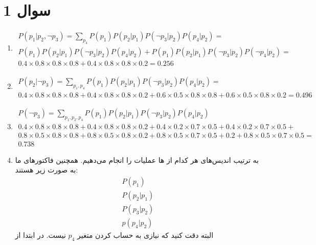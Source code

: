 \section*{سوال 1}
\begin{enumerate}
    \item \phantom{متن}
    \begin{gather*}
        P(p_1 | p_2, \neg p_3) = \sum_{p_4} P(p_1) P(p_2 | p_1) P(\neg p_3 | p_2) P(p_4 | p_2) =\\
        P(p_1) P(p_2 | p_1) P(\neg p_3 | p_2) P(p_4 | p_2) + P(p_1) P(p_2 | p_1) P(\neg p_3 | p_2) P(\neg p_4 | p_2) =\\
        0.4 \times 0.8 \times 0.8 \times 0.8 + 0.4 \times 0.8 \times 0.8 \times 0.2 = 0.256
    \end{gather*}
    \item \phantom{متن}
    \begin{gather*}
        P(p_2 | \neg p_3) = \sum_{p_1, p_4} P(p_1) P(p_2 | p_1) P(\neg p_3 | p_2) P(p_4 | p_2) =\\
        0.4 \times 0.8 \times 0.8 \times 0.8 + 0.4 \times 0.8 \times 0.8 \times 0.2 + 0.6 \times 0.5 \times 0.8 \times 0.8 + 0.6 \times 0.5 \times 0.8 \times 0.2 = 0.496
    \end{gather*}
    \item \phantom{متن}
    \begin{gather*}
        P(\neg p_3) = \sum_{p_1, p_2, p_4} P(p_1) P(p_2 | p_1) P(\neg p_3 | p_2) P(p_4 | p_2)\\
        0.4 \times 0.8 \times 0.8 \times 0.8 + 0.4 \times 0.8 \times 0.8 \times 0.2 + 0.4 \times 0.2 \times 0.7 \times 0.5 + 0.4 \times 0.2 \times 0.7 \times 0.5 +\\
        0.8 \times 0.5 \times 0.8 \times 0.8 + 0.8 \times 0.5 \times 0.8 \times 0.2 + 0.8 \times 0.5 \times 0.7 \times 0.5 + 0.2 + 0.8 \times 0.5 \times 0.7 \times 0.5 =\\
        0.738
    \end{gather*}
    \item به ترتیب اندیس‌های هر کدام از ها عملیات را انجام می‌دهیم.
    همچنین فاکتور‌های ما به صورت زیر هستند:
    \begin{gather*}
        P(p_1)\\
        P(p_2 | p_1)\\
        P(p_3 | p_2)\\
        p(p_4 | p_2)
    \end{gather*}
    البته دقت کنید که نیازی به حساب کردن متغیر
    $p_4$
    نیست. در ابتدا از

\end{enumerate}
